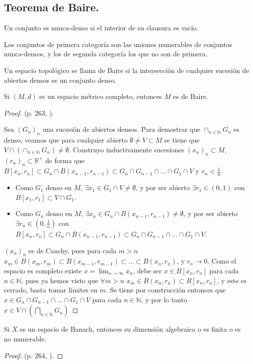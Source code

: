 \subsection{Teorema de Baire.}

\begin{definition}
  Un conjunto es nunca-denso si el interior de su clausura es vacío.
\end{definition}

\begin{definition}
  Los conjuntos de primera categoría son las uniones numerables de conjuntos
  nunca-densos, y los de segunda categoría los que no son de primera.
\end{definition}

\begin{definition}
  Un espacio topológico se llama de Baire si la intersección de cualquier
  sucesión de abiertos densos es un conjunto denso.
\end{definition}

\begin{theorem}[Baire]
  Si $(M,d)$ es un espacio métrico completo, entonces $M$ es de Baire.
\end{theorem}
\begin{proof}
  (p. 263, \cite{cascales2012}).

  Sea $(G_n)_n$ una sucesión de abiertos densos. Para demostrar que $\cap_{n\in
  \mathbb{N}} G_n$ es denso, veamos que para cualquier abierto $\emptyset\neq
  V\subset M$ se tiene que $V\cap \left( \cap _{n\in \mathbb{N}}G_n \right) \neq
  \emptyset$. Construyo inductivamente sucesiones $(x_n)_n\subset M$,
  $(r_n)_n\subset \mathbb{R}^+$ de forma que $B[x_n,r_n] \subset G_n\cap
  B(x_{n-1},r_{n-1}) \subset G_n \cap G_{n-1}\cap \ldots\cap G_1 \cap V$ y $r_n
  < \frac{1}{n}$.

  \begin{itemize}
    \item Como $G_1$ denso en $M$, $\exists x_1 \in G_1\cap V\neq \emptyset$, y
      por ser abierto $\exists r_1 \in (0,1)$ con $B[x_1,r_1] \subset V\cap
      G_1$.
    \item Como $G_n$ denso en $M$, $\exists x_n \in G_n\cap
      B(x_{n-1},r_{n-1})\neq \emptyset$, y por ser abierto $\exists r_n \in
      (0,\frac{1}{n})$ con $B[x_n,r_n] \subset G_n\cap B(x_{n-1},r_{n-1})
      \subset G_n \cap G_{n-1}\cap \ldots\cap G_1 \cap V$.
  \end{itemize}

  $(x_n)_n$ es de Cauchy, pues para cada $m>n$  $x_m \in B(x_m,r_m)\subset
  B(x_{m-1},r_{m-1})\subset \ldots\subset B(x_n,r_n)$, y $r_n\to 0$. Como el
  espacio es completo existe $x=\lim_{n \to \infty} x_n$, debe ser $x\in
  B[x_n,r_n]$ para cada $n\in \mathbb{N}$, pues ya hemos visto que $\forall m>n$ 
  $x_m\in B(x_n,r_n)\subset B[x_n,r_n]$, y este es cerrado, basta tomar límites
  en $m$. Se tiene por construcción entonces que $x\in G_n \cap G_{n-1}\cap
  \ldots\cap G_1 \cap V$ para cada $n\in \mathbb{N}$, y por lo tanto $x\in V\cap
  \left( \bigcap_{n\in \mathbb{N}} G_n \right) $
\end{proof}

\begin{corollary}
  Si $X$ es un espacio de Banach, entonces su dimensión algebraica o es finita o
  es no numerable.
\end{corollary}

\begin{proof}
  (p. 264, \cite{cascales2012}).
\end{proof}

